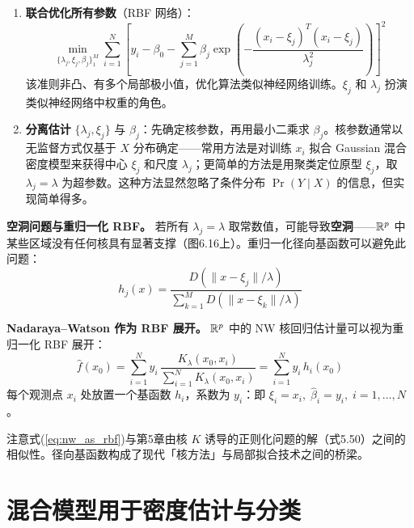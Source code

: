 \begin{enumerate}
    \item \textbf{联合优化所有参数}（RBF 网络）：
    \begin{equation}\label{eq:rbf_network}
        \min_{\{\lambda_j, \xi_j, \beta_j\}_1^M} \sum_{i=1}^{N} \left[ y_i - \beta_0 - \sum_{j=1}^{M} \beta_j \exp\!\left(-\frac{(x_i - \xi_j)^T (x_i - \xi_j)}{\lambda_j^2}\right) \right]^2
    \end{equation}
    该准则非凸、有多个局部极小值，优化算法类似神经网络训练。$\xi_j$ 和 $\lambda_j$ 扮演类似神经网络中权重的角色。

    \item \textbf{分离估计} $\{\lambda_j, \xi_j\}$ 与 $\beta_j$：先确定核参数，再用最小二乘求 $\beta_j$。核参数通常以无监督方式仅基于 $X$ 分布确定——常用方法是对训练 $x_i$ 拟合 Gaussian 混合密度模型来获得中心 $\xi_j$ 和尺度 $\lambda_j$；更简单的方法是用聚类定位原型 $\xi_j$，取 $\lambda_j = \lambda$ 为超参数。这种方法显然忽略了条件分布 $\Pr(Y \mid X)$ 的信息，但实现简单得多。
\end{enumerate}

\textbf{空洞问题与重归一化 RBF。} 若所有 $\lambda_j = \lambda$ 取常数值，可能导致\textbf{空洞}——$\mathbb{R}^p$ 中某些区域没有任何核具有显著支撑（图6.16上）。重归一化径向基函数可以避免此问题：
\begin{equation}\label{eq:renormalized_rbf}
    h_j(x) = \frac{D(\|x - \xi_j\| / \lambda)}{\sum_{k=1}^{M} D(\|x - \xi_k\| / \lambda)}
\end{equation}

\textbf{Nadaraya--Watson 作为 RBF 展开。} $\mathbb{R}^p$ 中的 NW 核回归估计量可以视为重归一化 RBF 展开：
\begin{equation}\label{eq:nw_as_rbf}
    \hat{f}(x_0) = \sum_{i=1}^{N} y_i \, \frac{K_\lambda(x_0, x_i)}{\sum_{i=1}^{N} K_\lambda(x_0, x_i)} = \sum_{i=1}^{N} y_i \, h_i(x_0)
\end{equation}
每个观测点 $x_i$ 处放置一个基函数 $h_i$，系数为 $y_i$：即 $\xi_i = x_i,\; \hat{\beta}_i = y_i,\; i = 1,\ldots,N$。

注意式(\ref{eq:nw_as_rbf})与第5章由核 $K$ 诱导的正则化问题的解（式5.50）之间的相似性。径向基函数构成了现代「核方法」与局部拟合技术之间的桥梁。

\section{混合模型用于密度估计与分类}

